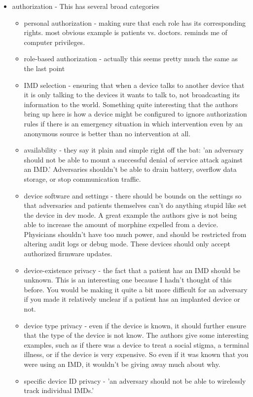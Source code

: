 \documentclass{article}
\begin{document}
\begin{itemize}
\item authorization - This has several broad categories
\begin{itemize}
\item personal authorization - making sure that each role has its corresponding rights. most obvious example is patients vs. doctors. reminds me of computer privileges. 
\item role-based authorization - actually this seems pretty much the same as the last point
\item IMD selection - ensuring that when a device talks to another device that it is only talking to the devices it wants to talk to, not broadcasting its information to the world. Something quite interesting that the authors bring up here is how a device might be configured to ignore authorization rules if there is an emergency situation in which intervention even by an anonymous source is better than no intervention at all. 
\item availability - they say it plain and simple right off the bat: 'an adversary should not be able to mount a successful denial of service attack against an IMD.' Adversaries shouldn't be able to drain battery, overflow data storage, or stop communication traffic. 
\item device software and settings - there should be bounds on the settings so that adversaries and patients themselves can't do anything stupid like set the device in dev mode. A great example the authors give is not being able to increase the amount of morphine expelled from a device. Physicians shouldn't have too much power, and should be restricted from altering audit logs or debug mode. These devices should only accept authorized firmware updates. 
\item device-existence privacy - the fact that a patient has an IMD should be unknown. This is an interesting one because I hadn't thought of this before. You would be making it quite a bit more difficult for an adversary if you made it relatively unclear if a patient has an implanted device or not. 
\item device type privacy - even if the device is known, it should further ensure that the type of the device is not know. The authors give some interesting examples, such as if there was a device to treat a social stigma, a terminal illness, or if the device is very expensive. So even if it was known that you were using an IMD, it wouldn't be giving away much about why. 
\item specific device ID privacy - 'an adversary should not be able to wirelessly track individual IMDs.' 

\end{itemize}
\end{itemize}
\end{document}

